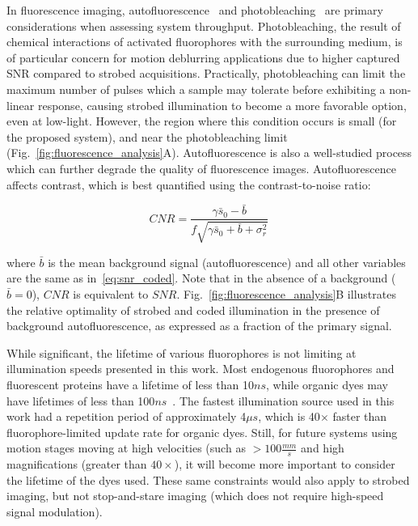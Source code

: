 In fluorescence imaging, autofluorescence~\cite{autofluor} and photobleaching~\cite{lippincott2003photobleaching} are primary considerations when assessing system throughput. Photobleaching, the result of chemical interactions of activated fluorophores with the surrounding medium, is of particular concern for motion deblurring applications due to higher captured SNR compared to strobed acquisitions. Practically, photobleaching can limit the maximum number of pulses which a sample may tolerate before exhibiting a non-linear response, causing strobed illumination to become a more favorable option, even at low-light. However, the region where this condition occurs is small (for the proposed system), and near the photobleaching limit (Fig.~\ref{fig:fluorescence_analysis}A). Autofluorescence is also a well-studied process which can further degrade the quality of fluorescence images. Autofluorescence affects contrast, which is best quantified using the contrast-to-noise ratio:

\begin{equation}
    \label{eq:cnr}
    CNR  = \frac{\gamma\bar{s}_0 - \bar{b}}{f\sqrt{\gamma\bar{s}_0 + \bar{b} + \sigma^2_{r}}}\:
\end{equation}

\noindent where $\bar{b}$ is the mean background signal (autofluorescence) and all other variables are the same as in~\eqref{eq:snr_coded}. Note that in the absence of a background ($\bar{b} = 0$), $CNR$ is equivalent to $SNR$. Fig.~\ref{fig:fluorescence_analysis}B illustrates the relative optimality of strobed and coded illumination in the presence of background autofluorescence, as expressed as a fraction of the primary signal.

While significant, the lifetime of various fluorophores is not limiting at illumination speeds presented in this work. Most endogenous fluorophores and fluorescent proteins have a lifetime of less than 10$ns$, while organic dyes may have lifetimes of less than 100$ns$~\cite{fluorlifetime2010}. The fastest illumination source used in this work had a repetition period of approximately 4$\mu s$, which is 40$\times$ faster than fluorophore-limited update rate for organic dyes. Still, for future systems using motion stages moving at high velocities (such as $>100\frac{mm}{s}$ and high magnifications (greater than $40\times$), it will become more important to consider the lifetime of the dyes used. These same constraints would also apply to strobed imaging, but not stop-and-stare imaging (which does not require high-speed signal modulation).

